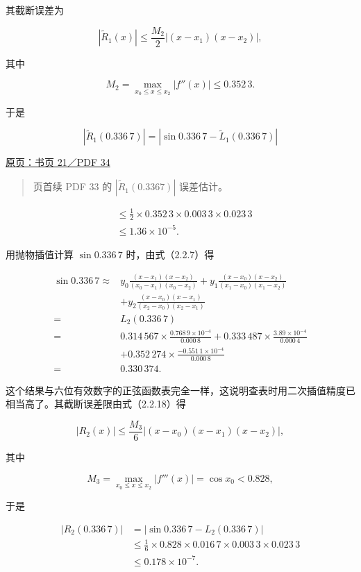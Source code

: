 \documentclass[
  10pt,
  fontset=fandol]{ctexart}
\begin{document}
其截断误差为

\[
|\widetilde R_1(x)|\le\frac{M_2}{2}|(x-x_1)(x-x_2)|,
\]

其中

\[
M_2=\max_{x_0\le x\le x_2}|f''(x)|\le0.352\,3.
\]

于是

\[
|\widetilde R_1(0.336\,7)|=|\sin0.336\,7-\widetilde L_1(0.336\,7)|
\]

\href{../../source-images/pdf-034.jpeg}{原页：书页 21／PDF 34}

\begin{quote}
页首续 PDF 33 的 \(|\widetilde R_1(0.3367)|\) 误差估计。
\end{quote}

\[
\begin{aligned}
&\le\frac12\times0.352\,3\times0.003\,3\times0.023\,3\\
&\le1.36\times10^{-5}.
\end{aligned}
\]

用抛物插值计算 \(\sin0.336\,7\) 时，由式（2.2.7）得

\[
\begin{aligned}
\sin0.336\,7\approx{}&
y_0\frac{(x-x_1)(x-x_2)}{(x_0-x_1)(x_0-x_2)}
+y_1\frac{(x-x_0)(x-x_2)}{(x_1-x_0)(x_1-x_2)}\\
&+y_2\frac{(x-x_0)(x-x_1)}{(x_2-x_0)(x_2-x_1)}\\
={}&L_2(0.336\,7)\\
={}&0.314\,567\times\frac{0.768\,9\times10^{-4}}{0.000\,8}
+0.333\,487\times\frac{3.89\times10^{-4}}{0.000\,4}\\
&+0.352\,274\times\frac{-0.551\,1\times10^{-4}}{0.000\,8}\\
={}&0.330\,374.
\end{aligned}
\]

这个结果与六位有效数字的正弦函数表完全一样，这说明查表时用二次插值精度已相当高了。其截断误差限由式（2.2.18）得

\[
|R_2(x)|\le\frac{M_3}{6}|(x-x_0)(x-x_1)(x-x_2)|,
\]

其中

\[
M_3=\max_{x_0\le x\le x_2}|f'''(x)|=\cos x_0<0.828,
\]

于是

\[
\begin{aligned}
|R_2(0.336\,7)|
&=|\sin0.336\,7-L_2(0.336\,7)|\\
&\le\frac16\times0.828\times0.016\,7\times0.003\,3\times0.023\,3\\
&\le0.178\times10^{-7}.
\end{aligned}
\]
\end{document}
